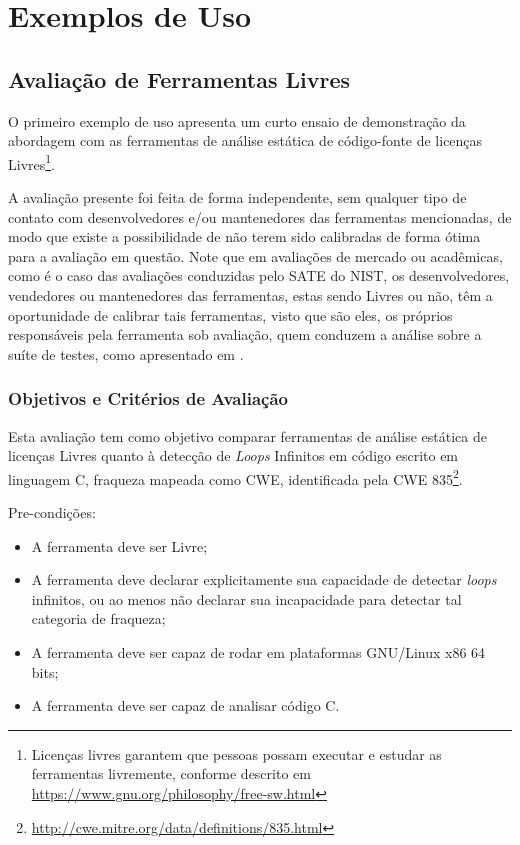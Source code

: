 \chapter{Exemplos de Uso}\label{exemplos_de_uso}

\section{Avaliação de Ferramentas Livres}

O primeiro exemplo de uso apresenta um curto ensaio de demonstração da abordagem com as ferramentas de análise estática de código-fonte de licenças Livres\footnote{Licenças livres garantem que pessoas possam executar e estudar as ferramentas livremente, conforme descrito em \url{https://www.gnu.org/philosophy/free-sw.html}}. 

A avaliação presente foi feita de forma independente, sem qualquer tipo de contato com desenvolvedores e/ou mantenedores das ferramentas mencionadas, de modo que existe a possibilidade de não terem sido calibradas de forma ótima para a avaliação em questão. Note que em avaliações de mercado ou acadêmicas, como é o caso das avaliações conduzidas pelo SATE do NIST, os desenvolvedores, vendedores ou mantenedores das ferramentas, estas sendo Livres ou não, têm a oportunidade de calibrar tais ferramentas, visto que são eles, os próprios responsáveis pela ferramenta sob avaliação, quem conduzem a análise sobre a suíte de testes, como apresentado em \cite{sate_iv}.

\subsection{Objetivos e Critérios de Avaliação}

Esta avaliação tem como objetivo comparar ferramentas de análise estática de licenças Livres quanto à detecção de \textit{Loops} Infinitos em código escrito em linguagem C, fraqueza mapeada como CWE, identificada pela CWE 835\footnote{\url{http://cwe.mitre.org/data/definitions/835.html}}.

Pre-condições:
\begin{itemize}
  \item A ferramenta deve ser Livre;
  \item A ferramenta deve declarar explicitamente sua capacidade de detectar \textit{loops} infinitos, ou ao menos não declarar sua incapacidade para detectar tal categoria de fraqueza;
  \item A ferramenta deve ser capaz de rodar em plataformas GNU/Linux x86 64 bits;
  \item A ferramenta deve ser capaz de analisar código C.
\end{itemize}

